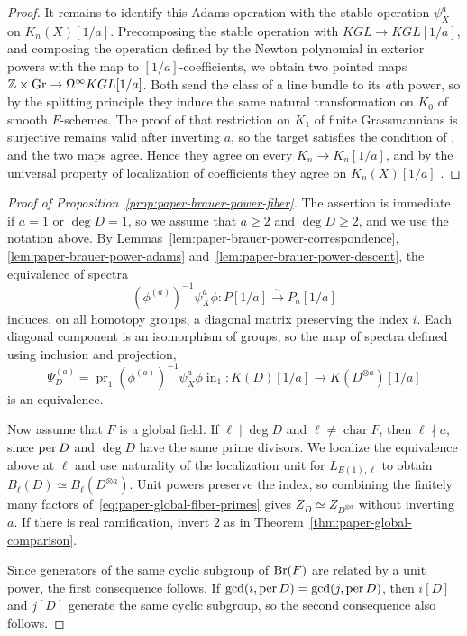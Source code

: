 \begin{proof}
It remains to identify this Adams operation with the stable operation $\psi_X^a$ on $K_n(X)[1/a]$.
Precomposing the stable operation with $KGL\to KGL[1/a]$, and composing the operation defined by the Newton polynomial in exterior powers with the map to $[1/a]$-coefficients, we obtain two pointed maps $\mathbb Z\times\mathrm{Gr}\to\Omega^\infty KGL[1/a]$.
Both send the class of a line bundle to its $a$th power, so by the splitting principle they induce the same natural transformation on $K_0$ of smooth $F$-schemes.
The proof of \cite[Lemma 1.2.10]{Riou2010} that restriction on $K_1$ of finite Grassmannians is surjective remains valid after inverting $a$, so the target satisfies the condition of \cite[Theorem 1.1.6]{Riou2010}, and the two maps agree.
Hence they agree on every $K_n\to K_n[1/a]$, and by the universal property of localization of coefficients they agree on $K_n(X)[1/a]$ \cite[Example 9.6]{AnnalaHoyoisIwasa}.
\end{proof}

\begin{proof}[Proof of Proposition~\ref{prop:paper-brauer-power-fiber}]
The assertion is immediate if $a=1$ or $\deg D=1$, so we assume that $a\ge2$ and $\deg D\ge2$, and we use the notation above.
By Lemmas~\ref{lem:paper-brauer-power-correspondence}, \ref{lem:paper-brauer-power-adams} and~\ref{lem:paper-brauer-power-descent}, the equivalence of spectra
\[
 (\phi^{(a)})^{-1}\psi_X^a\phi:P[1/a]\xrightarrow{\sim}P_a[1/a]
\]
induces, on all homotopy groups, a diagonal matrix preserving the index $i$.
Each diagonal component is an isomorphism of groups, so the map of spectra defined using inclusion and projection,
\[
 \Psi_D^{(a)}=\operatorname{pr}_1(\phi^{(a)})^{-1}\psi_X^a\phi\operatorname{in}_1:
 K(D)[1/a]\longrightarrow K(D^{\otimes a})[1/a]
\]
is an equivalence.

Now assume that $F$ is a global field.
If $\ell\mid \deg D$ and $\ell\ne\operatorname{char}F$, then $\ell\nmid a$, since $\operatorname{per} D$ and $\deg D$ have the same prime divisors.
We localize the equivalence above at $\ell$ and use naturality of the localization unit for $L_{E(1),\ell}$ to obtain $B_\ell(D)\simeq B_\ell(D^{\otimes a})$.
Unit powers preserve the index, so combining the finitely many factors of~\eqref{eq:paper-global-fiber-primes} gives $Z_D\simeq Z_{D^{\otimes a}}$ without inverting $a$.
If there is real ramification, invert $2$ as in Theorem~\ref{thm:paper-global-comparison}.

Since generators of the same cyclic subgroup of $\operatorname{Br}(F)$ are related by a unit power, the first consequence follows.
If $\gcd(i,\operatorname{per} D)=\gcd(j,\operatorname{per} D)$, then $i[D]$ and $j[D]$ generate the same cyclic subgroup, so the second consequence also follows.
\end{proof}

